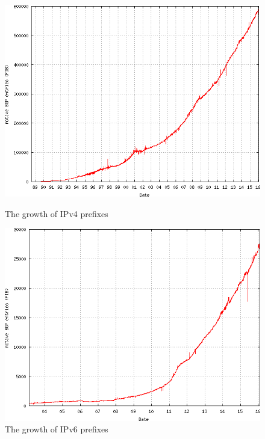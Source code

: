 \begin{figure}[hb!]
\RawFloats
\centering
\begin{minipage}{.5\textwidth}
  \centering
  \includegraphics[scale=0.32]{images/plot-ipv4.png}
  \caption{The growth of IPv4 prefixes \cite{plotipv4}}
  \label{fig:ipv4prefixes}
\end{minipage}%
\begin{minipage}{.5\textwidth}
  \centering
  \includegraphics[scale=0.32]{images/plot-ipv6.png}
  \caption{The growth of IPv6 prefixes \cite{plotipv6}}
  \label{fig:ipv6prefixes}
\end{minipage}
\end{figure}

